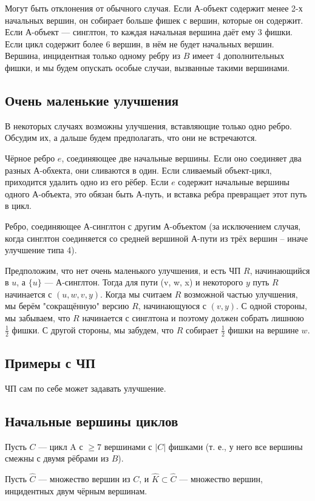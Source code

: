 \begin{proofstar}
Могут быть отклонения от обычного случая. Если А-объект содержит менее 2-х начальных вершин, он собирает больше фишек с вершин, которые он содержит. Если А-объект --- синглтон, то каждая начальная вершина даёт ему 3 фишки. Если цикл содержит более 6 вершин, в нём не будет начальных вершин. Вершина, инцидентная только одному ребру из $B$ имеет 4 дополнительных фишки, и мы будем опускать особые случаи, вызванные такими вершинами.

\subsection{Очень маленькие улучшения}
В некоторых случаях возможны улучшения, вставляющие только одно ребро. Обсудим их, а дальше будем предполагать, что они не встречаются.

Чёрное ребро $e$, соединяющее две начальные вершины. Если оно соединяет два разных А-обхекта, они сливаются в один. Если сливаемый объект-цикл, приходится удалить одно из его рёбер. Если $e$ содержит начальные вершины одного А-объекта, это обязан быть А-путь, и вставка ребра превращает этот путь в цикл.

Ребро, соединяющее А-синглтон с другим А-объектом (за исключением случая, когда синглтон соединяется со средней вершиной А-пути из трёх вершин -- иначе улучшение типа 4).

Предположим, что нет очень маленького улучшения, и есть ЧП $R$, начинающийся в $u$, а $\{u\}$ --- А-синглтон. Тогда для пути (v, w, x) и некоторого $y$ путь $R$ начинается с $(u, w, v, y)$. Когда мы считаем $R$ возможной частью улучшения, мы берём "сокращённую" версию $R$, начинающуюся с $(v, y)$. С одной стороны, мы забываем, что $R$ начинается с синглтона и поэтому должен собрать лишнюю $\frac{1}{2}$ фишки. С другой стороны, мы забудем, что $R$ собирает $\frac{1}{2}$ фишки на вершине $w$.

\subsection{Примеры с ЧП}
ЧП сам по себе может задавать улучшение. 

\subsection{Начальные вершины циклов}
Пусть $C$ --- цикл A с $\ge 7$ вершинами с $|C|$ фишками (т. е., у него все вершины смежны с двумя рёбрами из $B$).

Пусть $\hat{C}$ --- множество вершин из $C$, и $\hat{K} \subset \hat{C}$ --- множество вершин, инцидентных двум чёрным вершинам. 


\end{proofstar}
